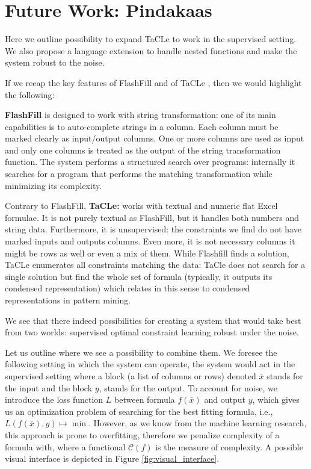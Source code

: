 
\section{Future Work: Pindakaas}
Here we outline possibility to expand TaCLe to work in
the supervised setting. We also propose a language extension to
handle nested functions and make the system robust to the noise.

If we recap the key features of FlashFill \parencite{flashfill} and of TaCLe
\parencite{tacle}, then we would highlight the following:

\textbf{FlashFill} is designed to work with string transformation: one of its main capabilities is to
  auto-complete strings in a column. Each column must be marked clearly as input/output columns. One or more columns are used as
  input and only one columns is treated as the output of the string
  transformation function. The system performs a structured search over programs: internally it searches for a
  program that performs the matching transformation while minimizing its complexity.

Contrary to FlashFill, \textbf{TaCLe:} works with textual and numeric flat Excel formulae. It is not purely
    textual as FlashFill, but it handles both numbers and string data. Furthermore, it is unsupervised: the constraints we find do not have marked 
    inputs and outputs columns. Even more, it is not necessary columns it might be rows as well or even a mix of them.
  While Flashfill finds a solution, TaCLe enumerates all constraints matching the data: TaCle does not
    search for a single solution but find the whole set of formula
    (typically, it outputs its condensed representation) which relates in this sense to condensed representations in pattern mining.

We see that there indeed possibilities for creating a system that
would take best from two worlds: supervised optimal constraint
learning robust under the noise.


Let us outline where we see a possibility to combine them. We foresee the following setting in which the system can operate, the system would act in the supervised setting where a block (a list of columns or rows) denoted $\bar x$ stands for the input and the block $y$, stands for the output. To account for noise, we introduce the loss function $L$ between formula $f(\bar x)$ and output $y$, which gives us an optimization problem of searching for the best fitting formula, i.e., $L(f(\bar x),y) \mapsto \min$. However, as we know from the machine learning research, this approach is prone to overfitting, therefore we penalize complexity of a formula with, where a functional $\mathcal{C}(f)$ is the measure of complexity. A possible visual interface is depicted in Figure \ref{fig:visual_interface}.


